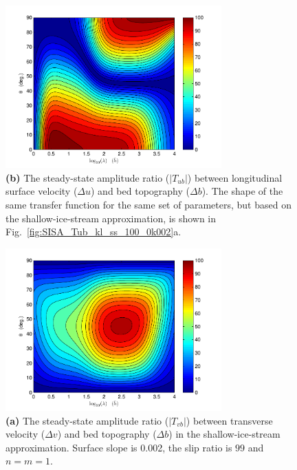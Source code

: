 \documentclass[10pt,a4paper]{book}
\newcommand{\T}{T}
\begin{document}
\begin{figure}
\vspace*{2mm}
\centerline{\includegraphics[width=8.3cm]{tc-2007-0016-f07b.pdf}}
\caption{{\bf (b)} The steady-state amplitude ratio ($|\T_{ub}|$) between
longitudinal surface velocity ($\Delta u$) and bed topography
($\Delta b$).  The shape of the
same transfer function for the same set of parameters, but based on
the shallow-ice-stream approximation, is shown in
Fig.~\ref{fig:SISA_Tub_kl_ss_100_0k002}a.
\label{fig:Tub_kl_ss_100_0k002}}
\end{figure}
\clearpage
\begin{figure}
\vspace*{2mm}
\centerline{\includegraphics[width=8.3cm]{tc-2007-0016-f08a.pdf}}
\caption{{\bf (a)} The steady-state amplitude ratio  ($|\T_{vb}|$) between
transverse velocity ($\Delta v$) and bed topography ($\Delta b$)
in the shallow-ice-stream approximation.
Surface slope is 0.002, the slip ratio is $99$ and $n=m=1$.
\label{fig:SISA_Tvb_kl_ss_100_0k002}}
\end{figure}

\addtocounter{figure}{-1}
\end{document}
